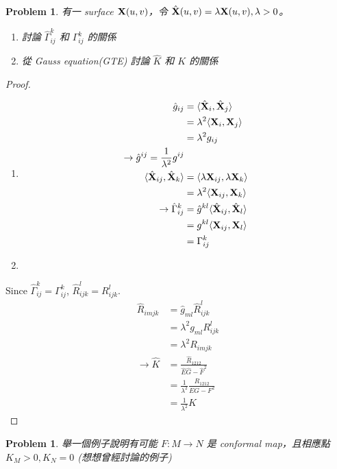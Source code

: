 \documentclass[10pt,a4paper]{article}
\newcounter{theProblemCounter}
\newtheorem{problem}[theProblemCounter]{Problem}
\begin{document}
\setcounter{theProblemCounter}{5}
\begin{problem}
有一 surface $\mathbf{X}(u, v)$，令 $\hat{\mathbf{X}}(u, v)=\lambda \mathbf{X}(u,v), \lambda > 0$。
\begin{enumerate}
\item[(a)] 討論 $\hat{\Gamma}^k_{ij}$ 和 $\Gamma^k_{ij}$ 的關係
\item[(b)] 從 Gauss equation(GTE) 討論 $\hat{K}$ 和 $K$ 的關係
\end{enumerate}
\end{problem}
\begin{proof}
\begin{enumerate}
\item[(a)]
\begin{align*}
\hat{g}_{ij}&=\langle\hat{\mathbf{X}}_i,\hat{\mathbf{X}}_j\rangle\\
&=\lambda^2\langle\mathbf{X}_i,\mathbf{X}_j\rangle\\
&=\lambda^2 g_{ij}\\
\rightarrow \hat{g}^{ij}=\frac{1}{\lambda^2}g^{ij}\\
\langle\hat{\mathbf{X}}_{ij},\hat{\mathbf{X}}_k\rangle&=\langle\lambda\mathbf{X}_{ij},\lambda \mathbf{X}_k\rangle\\
&=\lambda^2\langle\mathbf{X}_{ij},\mathbf{X}_k\rangle\\
\rightarrow \hat{\Gamma}_{ij}^k&=\hat{g}^{kl}\langle\hat{\mathbf{X}}_{ij},\hat{\mathbf{X}}_l\rangle\\
&=g^{kl}\langle\mathbf{X}_{ij},\mathbf{X}_l\rangle\\
&=\Gamma_{ij}^k
\end{align*}
\item[(b)]
\end{enumerate}
Since $\hat{\Gamma}_{ij}^k=\Gamma_{ij}^k$, $\hat{R}_{ijk}^l=R_{ijk}^l$.\\
\begin{align*}
\hat{R}_{imjk}&=\hat{g}_{ml}\hat{R}_{ijk}^l\\
&=\lambda^2 g_{ml}R_{ijk}^l\\
&=\lambda^2 R_{imjk}\\
\rightarrow \hat{K}&=\frac{\hat{R}_{1212}}{\hat{E}\hat{G}-\hat{F}^2}\\
&=\frac{1}{\lambda^2}\frac{R_{1212}}{EG-F^2}\\
&=\frac{1}{\lambda^2}K
\end{align*}
\end{proof}
\setcounter{theProblemCounter}{8}
\begin{problem}
舉一個例子說明有可能 $F:M\to N$ 是 conformal map，且相應點 $K_M>0, K_N=0$ (想想曾經討論的例子)
\end{problem}
\end{document}

